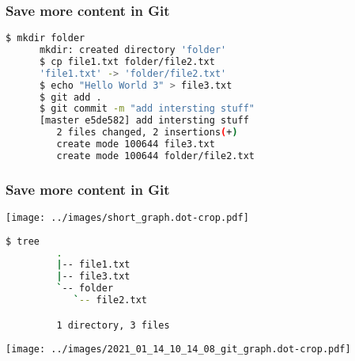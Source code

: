 \begin{frame}[fragile]\frametitle{Save more content in Git}
   \begin{lstlisting}[language=bash, style=bash, autogobble]
      $ mkdir folder
      mkdir: created directory 'folder'
      $ cp file1.txt folder/file2.txt
      'file1.txt' -> 'folder/file2.txt'
      $ echo "Hello World 3" > file3.txt
      $ git add .
      $ git commit -m "add intersting stuff"
      [master e5de582] add intersting stuff
         2 files changed, 2 insertions(+)
         create mode 100644 file3.txt
         create mode 100644 folder/file2.txt
   \end{lstlisting}
\end{frame}

\begin{frame}[fragile]\frametitle{Save more content in Git}
   \begin{minipage}{0.20\linewidth}
      \texttt{[image: ../images/short\_graph.dot-crop.pdf]}
   \end{minipage}
   \begin{minipage}{0.28\linewidth}
      \begin{lstlisting}[language=bash, style=bash, autogobble]
         $ tree
         .
         |-- file1.txt
         |-- file3.txt
         `-- folder
            `-- file2.txt

         1 directory, 3 files
      \end{lstlisting}
   \end{minipage}
   \begin{minipage}{0.48\linewidth}
      \begin{flushright}
      \texttt{[image: ../images/2021\_01\_14\_10\_14\_08\_git\_graph.dot-crop.pdf]}
      \end{flushright}
   \end{minipage}
\end{frame}

